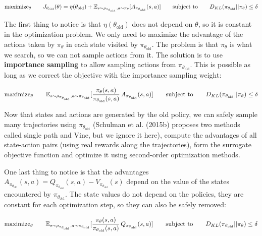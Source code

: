 \documentclass[
  letterpaper,
  DIV=11,
  numbers=noendperiod]{scrreprt}
\begin{document}
\[
    \text{maximize}_\theta \qquad J_{\theta_\text{old}}(\theta) = \eta(\theta_\text{old}) + \mathbb{E}_{s \sim \rho_{\pi_{\theta_\text{old}}}, a \sim \pi_\theta} [A_{\pi_{\theta_\text{old}}}(s, a)] \\
    \qquad \text{subject to} \qquad D_{KL}(\pi_{\theta_\text{old}} || \pi_\theta) \leq \delta
\]

The first thing to notice is that \(\eta(\theta_\text{old})\) does not
depend on \(\theta\), so it is constant in the optimization problem. We
only need to maximize the advantage of the actions taken by
\(\pi_\theta\) in each state visited by \(\pi_{\theta_\text{old}}\). The
problem is that \(\pi_\theta\) is what we search, so we can not sample
actions from it. The solution is to use \textbf{importance sampling} to
allow sampling actions from \(\pi_{\theta_\text{old}}\). This is
possible as long as we correct the objective with the importance
sampling weight:

\[
    \text{maximize}_\theta \qquad \mathbb{E}_{s \sim \rho_{\pi_{\theta_\text{old}}}, a \sim \pi_{\theta_\text{old}}} [\frac{\pi_\theta(s, a)}{\pi_{\theta_\text{old}}(s, a)} \, A_{\pi_{\theta_\text{old}}}(s, a)] \\
    \qquad \text{subject to} \qquad D_{KL}(\pi_{\theta_\text{old}} || \pi_\theta) \leq \delta
\]

Now that states and actions are generated by the old policy, we can
safely sample many trajectories using \(\pi_{\theta_\text{old}}\)
(Schulman et al. (2015b) proposes two methods called single path and
Vine, but we ignore it here), compute the advantages of all state-action
pairs (using real rewards along the trajectories), form the surrogate
objective function and optimize it using second-order optimization
methods.

One last thing to notice is that the advantages
\(A_{\pi_{\theta_\text{old}}}(s, a) = Q_{\pi_{\theta_\text{old}}}(s, a) - V_{\pi_{\theta_\text{old}}}(s)\)
depend on the value of the states encountered by
\(\pi_{\theta_\text{old}}\). The state values do not depend on the
policies, they are constant for each optimization step, so they can also
be safely removed:

\[
    \text{maximize}_\theta \qquad \mathbb{E}_{s \sim \rho_{\pi_{\theta_\text{old}}}, a \sim \pi_{\theta_\text{old}}} [\frac{\pi_\theta(s, a)}{\pi_{\theta_\text{old}}(s, a)} \, Q_{\pi_{\theta_\text{old}}}(s, a)] \\
    \qquad \text{subject to} \qquad D_{KL}(\pi_{\theta_\text{old}} || \pi_\theta) \leq \delta
\]
\end{document}
